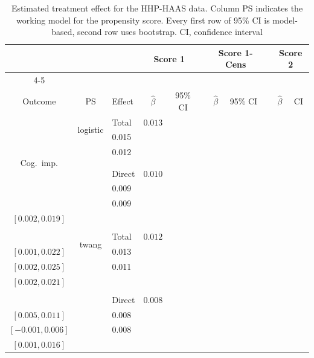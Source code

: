\documentclass[11pt]{article}
\begin{document}
\begin{table}[h]
\caption{Estimated treatment effect for the HHP-HAAS data. 
Column PS indicates the working model for the propensity score.
Every first row of 95\% CI is model-based,  second row uses bootstrap. CI, confidence interval}  \label{rd1}
\small
\setlength{\tabcolsep}{3.5pt}
\begin{center}
\begin{tabular}{ccl cc c cr c cc} %
\hline\hline
\multicolumn{2}{l}{} & & \multicolumn{2}{c}{Score 1} &&  \multicolumn{2}{c}{Score 1-Cens} &&  \multicolumn{2}{c}{Score 2}\tabularnewline %
\cline{4-5}\cline{7-8}\cline{10-11}
\\[-1.5ex] 
Outcome &  PS & Effect &\multicolumn{1}{c}{$\hat \beta$}&\multicolumn{1}{c}{95\% CI} &&\multicolumn{1}{c}{$\hat \beta$}&\multicolumn{1}{c}{95\% CI}&&\multicolumn{1}{c}{$\hat \beta$}&\multicolumn{1}{c}{CI}\tabularnewline\hline
\hline
\multirow{8}{*}{Cog.~imp.}&\multirow{2}{*}{logistic}
& Total 
& $0.013$ & \Centerstack{$[0.004,0.022]$ \\ $[0.003,0.023]$} && 0.015 &  \Centerstack{$[0.005,0.025]$ \\ $[0.004,0.022]$} && 0.012 &  \Centerstack{$[0.004,0.021]$ \\ $[0.003,0.022]$}
\\
 \\[-1.5ex] 
 
&
& Direct
& $0.010$ & \Centerstack{$[0.001,0.019]$ \\ $[0.002,0.019]$} && 0.009 &  \Centerstack{$[0.000,0.019]$ \\ $[0.000,0.019]$} && 0.009 &  \Centerstack{$[0.001,0.018]$ \\ $[0.002,0.019]$}
\\
\\%

&\multirow{2}{*}{twang}
& Total 
& $0.012$ & \Centerstack{$[0.003,0.020]$\\ $[0.001,0.022]$}&& 0.013  &  \Centerstack{$[0.004,0.023]$\\ $[0.002,0.025]$} && 0.011 &  \Centerstack{$[0.003,0.020]$ \\ $[0.002,0.021]$}
\tabularnewline
\\[-1.5ex] 

&
& Direct 
& $0.008$ & \Centerstack{$[0.000,0.017]$\\ $[0.005,0.011]$}& &0.008 &  \Centerstack{$[-0.002,0.017]$\\ $[-0.001,0.006]$} && 0.008 &  \Centerstack{$[0.000,0.016]$ \\ $[0.001,0.016]$}
\tabularnewline



\end{tabular}
\end{center}
\end{table}
\end{document}
